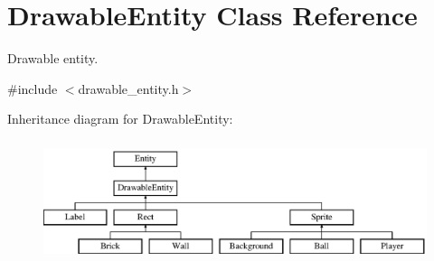 \hypertarget{class_drawable_entity}{}\section{Drawable\+Entity Class Reference}
\label{class_drawable_entity}


Drawable entity.  




{\ttfamily \#include $<$drawable\+\_\+entity.\+h$>$}

Inheritance diagram for Drawable\+Entity\+:\begin{figure}[H]
\begin{center}
\leavevmode
\includegraphics[height=3.555556cm]{class_drawable_entity}
\end{center}
\end{figure}

